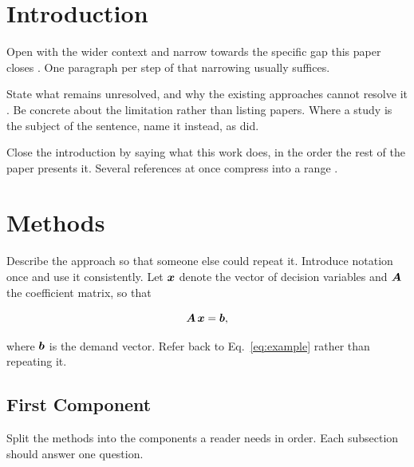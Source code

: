 \documentclass[12pt,a4paper]{article}
\begin{document}
\newpage

\tableofcontents
\newpage


\section{Introduction}

Open with the wider context and narrow towards the specific gap this paper
closes \cite{firstReference2024, secondReference2023}. One paragraph per step of
that narrowing usually suffices.

%
State what remains unresolved, and why the existing approaches cannot resolve it
\cite{thirdReference2022}. Be concrete about the limitation rather than listing
papers. Where a study is the subject of the sentence, name it instead, as
\citet{secondReference2023} did.

Close the introduction by saying what this work does, in the order the rest of
the paper presents it. Several references at once compress into a range
\cite{firstReference2024, secondReference2023, thirdReference2022}.


\section{Methods} \label{sec:methods}

%
Describe the approach so that someone else could repeat it. Introduce notation
once and use it consistently. Let $\vectorsym{x}$ denote the vector of decision
variables and $\matrixsym{A}$ the coefficient matrix, so that

\begin{equation} \label{eq:example}
    \matrixsym{A} \, \vectorsym{x} = \vectorsym{b},
\end{equation}

where $\vectorsym{b}$ is the demand vector. Refer back to
Eq.~\ref{eq:example} rather than repeating it.

\subsection{First Component} \label{sec:first_component}

Split the methods into the components a reader needs in order. Each subsection
should answer one question.
\end{document}
